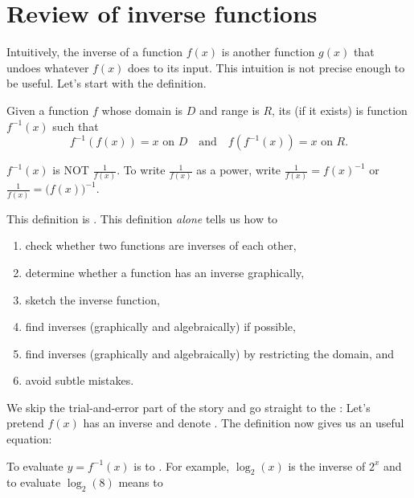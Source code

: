 \documentclass[../main.tex]{subfiles}
\begin{document}
 \section{Review of inverse functions}
  Intuitively, the inverse of a function \(f(x)\) is another function \(g(x)\) that undoes whatever \(f(x)\) does to its input. This intuition is not precise enough to be useful. Let's start with the definition.

  \begin{mdframed}[style=withref-compact]
    Given a function \(f\) whose domain is \(D\) and range is \(R\), its  (if it exists) is  function \(f^{-1}(x)\) such that
    \[
      f^{-1}(f(x)) = x \text{ on } D \quad\text{and}\quad f(f^{-1}(x)) = x \text{ on } R.
    \]

  \end{mdframed}

  {\faExclamationTriangle{} \(f^{-1}(x)\) is NOT \(\tfrac{1}{f(x)}\). To write \(\tfrac{1}{f(x)}\) as a power, write \(\tfrac{1}{f(x)} = f(x)^{-1}\) or \(\tfrac{1}{f(x)} = \big( f(x) \big)^{-1}\).}
  \bigskip

  This definition is . This definition \emph{alone} tells us how to
  \begin{enumerate}[noitemsep]
    \item check whether two functions are inverses of each other, 
    \item determine whether a function has an inverse graphically, 
    \item sketch the inverse function, 
    \item find inverses (graphically and algebraically) if possible,
    \item find inverses (graphically and algebraically) by restricting the domain, and
    \item avoid subtle mistakes.
  \end{enumerate}

  We skip the trial-and-error part of the story and go straight to the : Let's pretend \(f(x)\) has an inverse and denote \underline{\hspace{2in}}. The definition now gives us an useful equation:

  To evaluate \(y = f^{-1}(x)\) is to \underline{\hspace{4in}}. For example, \(\log_{2}(x)\) is the inverse of \(2^{x}\) and to evaluate \(\log_{2}(8)\) means to 
\end{document}
